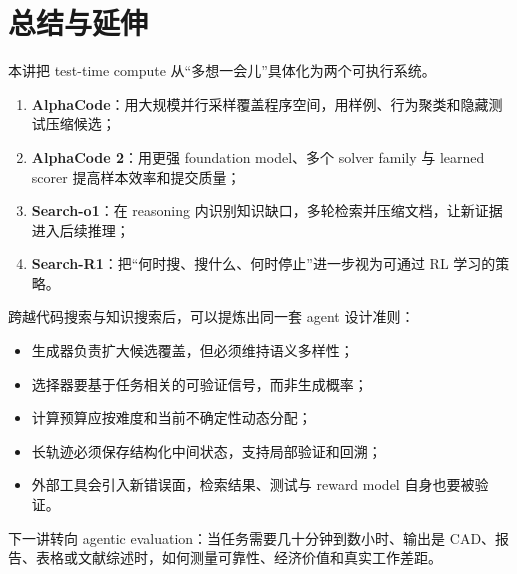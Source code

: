 \section{总结与延伸}

本讲把 test-time compute 从“多想一会儿”具体化为两个可执行系统。

\begin{enumerate}
    \item \textbf{AlphaCode}：用大规模并行采样覆盖程序空间，用样例、行为聚类和隐藏测试压缩候选；
    \item \textbf{AlphaCode 2}：用更强 foundation model、多个 solver family 与 learned scorer 提高样本效率和提交质量；
    \item \textbf{Search-o1}：在 reasoning 内识别知识缺口，多轮检索并压缩文档，让新证据进入后续推理；
    \item \textbf{Search-R1}：把“何时搜、搜什么、何时停止”进一步视为可通过 RL 学习的策略。
\end{enumerate}

跨越代码搜索与知识搜索后，可以提炼出同一套 agent 设计准则：

\begin{itemize}
    \item 生成器负责扩大候选覆盖，但必须维持语义多样性；
    \item 选择器要基于任务相关的可验证信号，而非生成概率；
    \item 计算预算应按难度和当前不确定性动态分配；
    \item 长轨迹必须保存结构化中间状态，支持局部验证和回溯；
    \item 外部工具会引入新错误面，检索结果、测试与 reward model 自身也要被验证。
\end{itemize}

下一讲转向 agentic evaluation：当任务需要几十分钟到数小时、输出是 CAD、报告、表格或文献综述时，如何测量可靠性、经济价值和真实工作差距。


